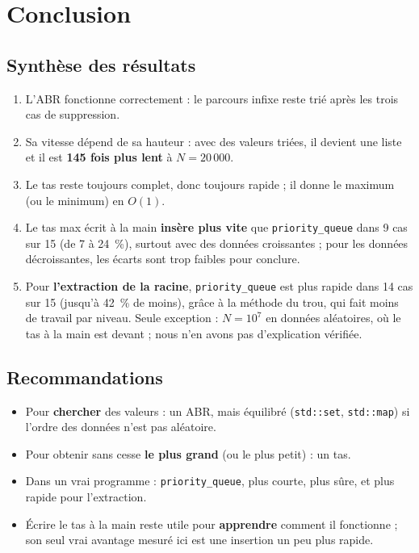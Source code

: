 \documentclass[12pt,a4paper]{report}
\begin{document}
\chapter{Conclusion}

\section{Synthèse des résultats}
\begin{enumerate}
  \item L'ABR fonctionne correctement : le parcours infixe reste trié après les trois cas de suppression.
  \item Sa vitesse dépend de sa hauteur : avec des valeurs triées, il devient une liste et il est \textbf{145 fois plus lent} à $N=20\,000$.
  \item Le tas reste toujours complet, donc toujours rapide ; il donne le maximum (ou le minimum) en $O(1)$.
  \item Le tas max écrit à la main \textbf{insère plus vite} que \texttt{priority\_queue} dans 9 cas sur 15 (de 7 à 24~\%), surtout avec des données croissantes ; pour les données décroissantes, les écarts sont trop faibles pour conclure.
  \item Pour \textbf{l'extraction de la racine}, \texttt{priority\_queue} est plus rapide dans 14 cas sur 15 (jusqu'à 42~\% de moins), grâce à la méthode du trou, qui fait moins de travail par niveau. Seule exception : $N=10^7$ en données aléatoires, où le tas à la main est devant ; nous n'en avons pas d'explication vérifiée.
\end{enumerate}

\section{Recommandations}
\begin{itemize}
  \item Pour \textbf{chercher} des valeurs : un ABR, mais équilibré (\texttt{std::set}, \texttt{std::map}) si l'ordre des données n'est pas aléatoire.
  \item Pour obtenir sans cesse \textbf{le plus grand} (ou le plus petit) : un tas.
  \item Dans un vrai programme : \texttt{priority\_queue}, plus courte, plus sûre, et plus rapide pour l'extraction.
  \item Écrire le tas à la main reste utile pour \textbf{apprendre} comment il fonctionne ; son seul vrai avantage mesuré ici est une insertion un peu plus rapide.
\end{itemize}
\end{document}
